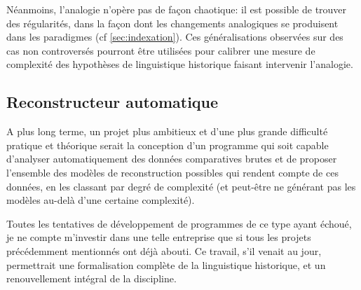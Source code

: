 \documentclass[oldfontcommands,oneside,a4paper,11pt]{article}
\begin{document}
Néanmoins, l'analogie n'opère pas de façon chaotique: il est possible de trouver des régularités, dans la façon dont les changements analogiques se produisent dans les paradigmes (cf \ref{sec:indexation}). Ces généralisations observées sur des cas non controversés pourront être utilisées pour calibrer une mesure de complexité des hypothèses de linguistique historique faisant intervenir l'analogie.

 \subsection{Reconstructeur automatique}
 A plus long terme, un projet plus ambitieux et d'une plus grande difficulté pratique et théorique serait la conception d'un programme qui soit capable d'analyser automatiquement des données comparatives brutes et de proposer l'ensemble des modèles de reconstruction possibles qui rendent compte de ces données, en les classant par degré de complexité (et peut-être ne générant pas les modèles au-delà d'une certaine complexité).
 
Toutes les tentatives de développement de programmes de ce type ayant échoué, je ne compte m'investir dans une telle entreprise que si tous les projets précédemment mentionnés ont déjà abouti. Ce travail, s'il venait au jour, permettrait une formalisation complète de la linguistique historique, et un renouvellement intégral de la discipline. 
 


 
\end{document}
